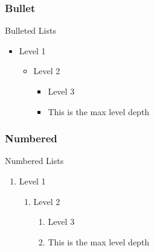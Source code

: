 \documentclass[%
  aspectratio=1610,
]{beamer}
\begin{document}
\subsubsection{Bullet}
\begin{frame}{Bulleted Lists}

\begin{itemize}
  \item Level 1
  \begin{itemize}
    \item Level 2
    \begin{itemize}
      \item Level 3
      \item This is the max level depth
    \end{itemize}
  \end{itemize}
\end{itemize}

\end{frame}

\subsubsection{Numbered}
\begin{frame}{Numbered Lists}

\begin{enumerate}
  \item Level 1
  \begin{enumerate}
    \item Level 2
    \begin{enumerate}
      \item Level 3
      \item This is the max level depth
    \end{enumerate}
  \end{enumerate}
\end{enumerate}

\end{frame}
\end{document}
